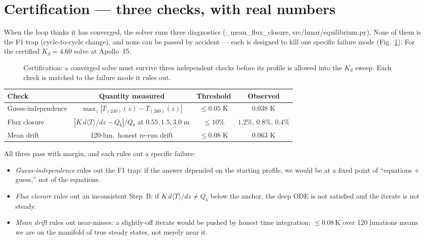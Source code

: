\documentclass[11pt]{report}
\newcommand{\Tm}{\langle T\rangle}
\newcommand{\code}[1]{{\ttfamily\small #1}}
\begin{document}
\medskip
{}
\par\medskip

\section{Certification --- three checks, with real numbers}\label{sec:cert}

When the loop thinks it has converged, the solver runs three diagnostics
(\code{\_mean\_flux\_closure}, \code{src/lunar/equilibrium.py}). None of them
is the F1 trap (cycle-to-cycle change), and none can be passed by accident ---
each is designed to kill one specific failure mode
(Fig.~\ref{fig:certflow}). For the certified $K_d=4.60$ solve at Apollo~15:

\begin{figure}[htbp]\centering

\caption{Certification: a converged solve must survive three independent
checks before its profile is allowed into the $K_d$ sweep. Each check is
matched to the failure mode it rules out.}
\label{fig:certflow}
\end{figure}

\begin{center}\small
\begin{tabular}{@{}lccc@{}}
\toprule
Check & Quantity measured & Threshold & Observed \\
\midrule
Guess-independence & $\max_z|T_{(240)}(z)-T_{(260)}(z)|$  & $\le 0.05$ K   & $0.038$ K \\
Flux closure       & $|K\,d\Tm/dz - Q_b|/Q_b$ at $0.55,1.5,3.0$ m & $\le 10\%$ & $1.2\%,\,0.8\%,\,0.4\%$ \\
Mean drift         & 120-lun.\ honest re-run drift     & $\le 0.08$ K   & $0.063$ K \\
\bottomrule
\end{tabular}
\end{center}

\noindent All three pass with margin, and each rules out a specific failure:
\begin{itemize}[leftmargin=1.4em,itemsep=2pt]
\item \emph{Guess-independence} rules out the F1 trap: if the answer depended on
  the starting profile, we would be at a fixed point of ``equations $+$ guess,''
  not of the equations.
\item \emph{Flux closure} rules out an inconsistent Step~B: if $K\,d\Tm/dz\ne
  Q_b$ below the anchor, the deep ODE is not satisfied and the iterate is not
  steady.
\item \emph{Mean drift} rules out near-misses: a slightly-off iterate would be
  pushed by honest time integration; $\le0.08$\,K over 120 lunations means we are
  on the manifold of true steady states, not merely near it.
\end{itemize}
\end{document}
